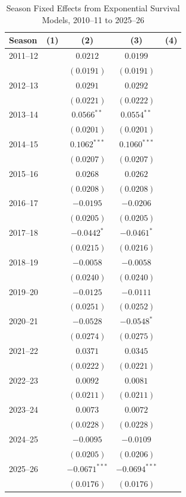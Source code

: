 \begin{table}[htbp]
\centering
\caption{Season Fixed Effects from Exponential Survival Models, 2010--11 to 2025--26}
\label{tab:season_control_results_20102011_20252026}
\scriptsize
\renewcommand{\arraystretch}{1.12}
\setlength{\tabcolsep}{6pt}

\begin{tabular*}{0.85\textwidth}{@{\extracolsep{\fill}}lcccc}
\toprule
Season & (1) & (2) & (3) & (4) \\
\midrule
2011--12 &  & $0.0212$ & $0.0199$ &  \\
 &  & $(0.0191)$ & $(0.0191)$ &  \\
2012--13 &  & $0.0291$ & $0.0292$ &  \\
 &  & $(0.0221)$ & $(0.0222)$ &  \\
2013--14 &  & $0.0566^{**}$ & $0.0554^{**}$ &  \\
 &  & $(0.0201)$ & $(0.0201)$ &  \\
2014--15 &  & $0.1062^{***}$ & $0.1060^{***}$ &  \\
 &  & $(0.0207)$ & $(0.0207)$ &  \\
2015--16 &  & $0.0268$ & $0.0262$ &  \\
 &  & $(0.0208)$ & $(0.0208)$ &  \\
2016--17 &  & $-0.0195$ & $-0.0206$ &  \\
 &  & $(0.0205)$ & $(0.0205)$ &  \\
2017--18 &  & $-0.0442^{*}$ & $-0.0461^{*}$ &  \\
 &  & $(0.0215)$ & $(0.0216)$ &  \\
2018--19 &  & $-0.0058$ & $-0.0058$ &  \\
 &  & $(0.0240)$ & $(0.0240)$ &  \\
2019--20 &  & $-0.0125$ & $-0.0111$ &  \\
 &  & $(0.0251)$ & $(0.0252)$ &  \\
2020--21 &  & $-0.0528$ & $-0.0548^{*}$ &  \\
 &  & $(0.0274)$ & $(0.0275)$ &  \\
2021--22 &  & $0.0371$ & $0.0345$ &  \\
 &  & $(0.0222)$ & $(0.0221)$ &  \\
2022--23 &  & $0.0092$ & $0.0081$ &  \\
 &  & $(0.0211)$ & $(0.0211)$ &  \\
2023--24 &  & $0.0073$ & $0.0072$ &  \\
 &  & $(0.0228)$ & $(0.0228)$ &  \\
2024--25 &  & $-0.0095$ & $-0.0109$ &  \\
 &  & $(0.0205)$ & $(0.0206)$ &  \\
2025--26 &  & $-0.0671^{***}$ & $-0.0694^{***}$ &  \\
 &  & $(0.0176)$ & $(0.0176)$ &  \\
\bottomrule
\end{tabular*}


\end{table}
